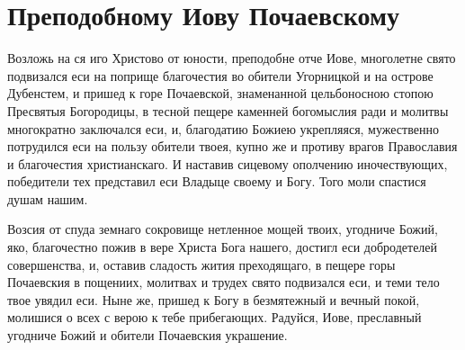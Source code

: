 \section{Преподобному Иову Почаевскому}\begin{mymulticols}


Возложь на ся иго Христово от юности, преподобне отче Иове, многолетне свято подвизался еси на поприще благочестия во обители Угорницкой и на острове Дубенстем, и пришед к горе Почаевской, знаменанной цельбоносною стопою Пресвятыя Богородицы, в тесной пещере каменней богомыслия ради и молитвы многократно заключался еси, и, благодатию Божиею укрепляяся, мужественно потрудился еси на пользу обители твоея, купно же и противу врагов Православия и благочестия христианскаго. И наставив сицевому ополчению иночествующих, победители тех представил еси Владыце своему и Богу. Того моли спастися душам нашим.


Возсия от спуда земнаго сокровище нетленное мощей твоих, угодниче Божий, яко, благочестно пожив в вере Христа Бога нашего, достигл еси добродетелей совершенства, и, оставив сладость жития преходящаго, в пещере горы Почаевския в пощениих, молитвах и трудех свято подвизался еси, и теми тело твое увядил еси. Ныне же, пришед к Богу в безмятежный и вечный покой, молишися о всех с верою к тебе прибегающих. Радуйся, Иове, преславный угодниче Божий и обители Почаевския украшение.



\end{mymulticols}

